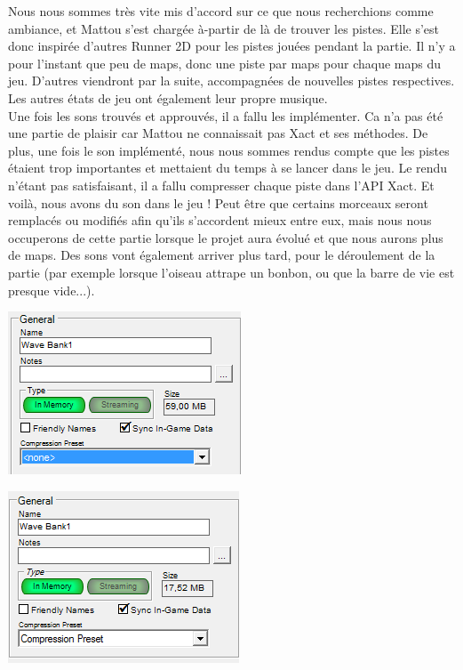 \documentclass [11pt]{report}
\begin{document}
	\indent Nous nous sommes très vite mis d'accord sur ce que nous recherchions comme ambiance, et Mattou s'est chargée à-partir de là  de trouver les pistes. Elle s'est donc inspirée d'autres Runner 2D pour les pistes jouées pendant la partie. Il n'y a pour l'instant que peu de maps, donc une piste par maps pour chaque maps du jeu. D'autres viendront par la suite, accompagnées de nouvelles pistes respectives. Les autres états de jeu ont également leur propre musique. \\
	
	
	\indent Une fois les sons trouvés et approuvés, il a fallu les implémenter. Ca n'a pas été une partie de plaisir car Mattou ne connaissait pas Xact et ses méthodes. De plus, une fois le son implémenté, nous nous sommes rendus compte que les pistes étaient trop importantes et mettaient du temps à se lancer dans le jeu. Le rendu n'étant pas satisfaisant, il a fallu compresser chaque piste dans l'API Xact. Et voilà, nous avons du son dans le jeu ! Peut être que certains morceaux seront remplacés ou modifiés afin qu'ils s'accordent mieux entre eux, mais nous nous occuperons de cette partie lorsque le projet aura évolué et que nous aurons plus de maps. Des sons vont  également arriver plus tard, pour le déroulement de la partie (par exemple lorsque l'oiseau attrape un bonbon, ou que la barre de vie est presque vide...).

		\vspace{8mm}
		
		\begin{center}
			\includegraphics[scale = 0.1]{images/compress-avant.PNG}
		\end{center}

		\vspace{4mm}
		
		\begin{center}
			\includegraphics[scale = 0.1]{images/compress-apres.PNG}
		\end{center}
		
\end{document}
